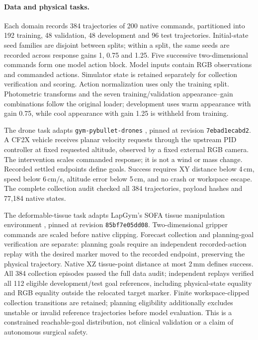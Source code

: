 \paragraph{Data and physical tasks.}
Each domain records 384 trajectories of 200 native commands, partitioned into
192 training, 48 validation, 48 development and 96 test trajectories.
Initial-state seed families are disjoint between splits; within a split,
the same seeds are recorded across response gains 1, 0.75 and 1.25.
Five successive two-dimensional commands form one model action block.
Model inputs contain RGB observations and commanded actions. Simulator
state is retained separately for collection verification and scoring.
Action normalization uses only the training split. Photometric transforms
and the seven training/validation appearance--gain combinations follow the
original loader; development uses warm appearance with gain 0.75, while
cool appearance with gain 1.25 is withheld from training.

The drone task adapts \texttt{gym-pybullet-drones}
\citep{panerati2021learning}, pinned at revision \texttt{7ebad1ecabd2}.
A CF2X vehicle receives planar velocity requests through the upstream PID
controller at fixed requested altitude, observed by a fixed external RGB
camera. The intervention scales commanded response; it is not a wind or
mass change. Recorded settled endpoints define goals. Success requires
XY distance below 4\,cm, speed below 6\,cm/s, altitude error below 5\,cm,
and no crash or workspace escape. The complete collection audit checked
all 384 trajectories, payload hashes and 77,184 native states.

The deformable-tissue task adapts LapGym's SOFA tissue manipulation
environment \citep{scheikl2023lapgym}, pinned at revision
\texttt{85bf7e05dd08}. Two-dimensional gripper commands are scaled before
native clipping. Forecast collection and planning-goal verification are
separate: planning goals require an independent recorded-action replay
with the desired marker moved to the recorded endpoint, preserving the
physical trajectory. Native XZ tissue-point distance at most 2\,mm defines
success. All 384 collection episodes passed the full data audit; independent
replays verified all 112 eligible development/test goal references, including
physical-state equality and RGB equality outside the relocated target marker.
Finite workspace-clipped collection transitions are retained;
planning eligibility additionally excludes unstable or invalid reference
trajectories before model evaluation. This is a constrained reachable-goal
distribution, not clinical validation or a claim of autonomous surgical safety.

